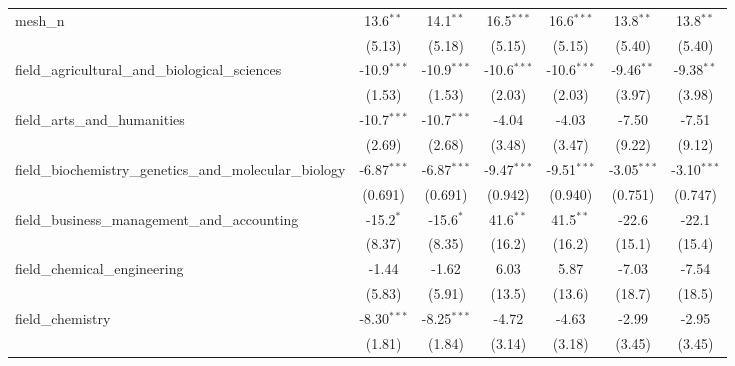\begin{tabular}{lcccccc}
   mesh\_n                                                     & 13.6$^{**}$    & 14.1$^{**}$   & 16.5$^{***}$  & 16.6$^{***}$  & 13.8$^{**}$   & 13.8$^{**}$\\   
                                                               & (5.13)         & (5.18)        & (5.15)        & (5.15)        & (5.40)        & (5.40)\\   
   field\_agricultural\_and\_biological\_sciences              & -10.9$^{***}$  & -10.9$^{***}$ & -10.6$^{***}$ & -10.6$^{***}$ & -9.46$^{**}$  & -9.38$^{**}$\\   
                                                               & (1.53)         & (1.53)        & (2.03)        & (2.03)        & (3.97)        & (3.98)\\   
   field\_arts\_and\_humanities                                & -10.7$^{***}$  & -10.7$^{***}$ & -4.04         & -4.03         & -7.50         & -7.51\\   
                                                               & (2.69)         & (2.68)        & (3.48)        & (3.47)        & (9.22)        & (9.12)\\   
   field\_biochemistry\_genetics\_and\_molecular\_biology      & -6.87$^{***}$  & -6.87$^{***}$ & -9.47$^{***}$ & -9.51$^{***}$ & -3.05$^{***}$ & -3.10$^{***}$\\   
                                                               & (0.691)        & (0.691)       & (0.942)       & (0.940)       & (0.751)       & (0.747)\\   
   field\_business\_management\_and\_accounting                & -15.2$^{*}$    & -15.6$^{*}$   & 41.6$^{**}$   & 41.5$^{**}$   & -22.6         & -22.1\\   
                                                               & (8.37)         & (8.35)        & (16.2)        & (16.2)        & (15.1)        & (15.4)\\   
   field\_chemical\_engineering                                & -1.44          & -1.62         & 6.03          & 5.87          & -7.03         & -7.54\\   
                                                               & (5.83)         & (5.91)        & (13.5)        & (13.6)        & (18.7)        & (18.5)\\   
   field\_chemistry                                            & -8.30$^{***}$  & -8.25$^{***}$ & -4.72         & -4.63         & -2.99         & -2.95\\   
                                                               & (1.81)         & (1.84)        & (3.14)        & (3.18)        & (3.45)        & (3.45)\\   

\end{tabular}
